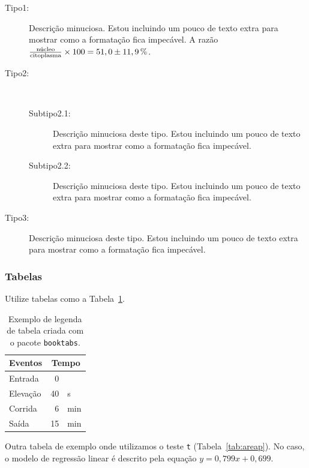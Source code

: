 \begin{description}
  \item[Tipo1:] Descrição minuciosa.
    Estou incluindo um pouco de texto extra para mostrar como a formatação fica impecável.
    A razão $\frac{\text{núcleo}}{\text{citoplasma}}\times100=51,0\pm\unit[11,9]{\%}$.
  \item[Tipo2:] ~
    \begin{description}
      \item[Subtipo2.1:] Descrição minuciosa deste tipo.
	Estou incluindo um pouco de texto extra para mostrar como a formatação fica impecável.
      \item[Subtipo2.2:] Descrição minuciosa deste tipo.
	Estou incluindo um pouco de texto extra para mostrar como a formatação fica impecável.
    \end{description}
  \item[Tipo3:] Descrição minuciosa deste tipo.
	Estou incluindo um pouco de texto extra para mostrar como a formatação fica impecável.
\end{description}

\subsubsection{Tabelas}\label{cap3:res:morf}

Utilize tabelas como a Tabela~\ref{tab:exemplo}.

\begin{table}[htbp]
    \caption[Tabela com \texttt{booktabs}]{Exemplo de legenda de tabela criada com o pacote \texttt{booktabs}.}
    \label{tab:exemplo}
    \vspace{1em}
    \centering
    \begin{tabular}{l r@{\,} l}
        \toprule
        Eventos     & \multicolumn{2}{c}{Tempo}\\
        \midrule
        Entrada     & 0   & \\
        Elevação    & 40  & s   \\
        Corrida     & 6   & min \\
        Saída       & 15  & min \\
        \bottomrule
    \end{tabular}
\end{table}

Outra tabela de exemplo onde utilizamos o teste \texttt{t} (Tabela~\ref{tab:areap}).
No caso, o modelo de regressão linear é descrito pela equação $y=0,799x+0,699$.

